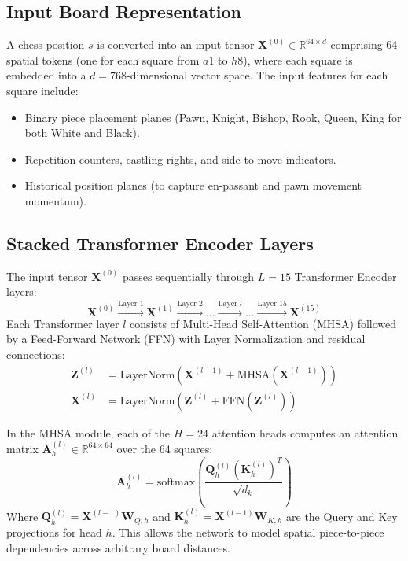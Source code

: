 \documentclass[11pt,a4paper]{report}
\begin{document}
\subsection{Input Board Representation}
A chess position $s$ is converted into an input tensor $\mathbf{X}^{(0)} \in \mathbb{R}^{64 \times d}$ comprising 64 spatial tokens (one for each square from $a1$ to $h8$), where each square is embedded into a $d=768$-dimensional vector space. The input features for each square include:
\begin{itemize}
    \item Binary piece placement planes (Pawn, Knight, Bishop, Rook, Queen, King for both White and Black).
    \item Repetition counters, castling rights, and side-to-move indicators.
    \item Historical position planes (to capture en-passant and pawn movement momentum).
\end{itemize}

\subsection{Stacked Transformer Encoder Layers}
The input tensor $\mathbf{X}^{(0)}$ passes sequentially through $L=15$ Transformer Encoder layers:
\begin{equation}
\mathbf{X}^{(0)} \xrightarrow{\text{Layer 1}} \mathbf{X}^{(1)} \xrightarrow{\text{Layer 2}} \dots \xrightarrow{\text{Layer } l} \dots \xrightarrow{\text{Layer 15}} \mathbf{X}^{(15)}
\end{equation}
Each Transformer layer $l$ consists of Multi-Head Self-Attention (MHSA) followed by a Feed-Forward Network (FFN) with Layer Normalization and residual connections:
\begin{align}
\mathbf{Z}^{(l)} &= \text{LayerNorm}\left( \mathbf{X}^{(l-1)} + \text{MHSA}\left( \mathbf{X}^{(l-1)} \right) \right) \\
\mathbf{X}^{(l)} &= \text{LayerNorm}\left( \mathbf{Z}^{(l)} + \text{FFN}\left( \mathbf{Z}^{(l)} \right) \right)
\end{align}

In the MHSA module, each of the $H=24$ attention heads computes an attention matrix $\mathbf{A}_{h}^{(l)} \in \mathbb{R}^{64 \times 64}$ over the 64 squares:
\begin{equation}
\mathbf{A}_{h}^{(l)} = \text{softmax}\left( \frac{\mathbf{Q}_{h}^{(l)} (\mathbf{K}_{h}^{(l)})^T}{\sqrt{d_k}} \right)
\end{equation}
Where $\mathbf{Q}_{h}^{(l)} = \mathbf{X}^{(l-1)} \mathbf{W}_{Q,h}$ and $\mathbf{K}_{h}^{(l)} = \mathbf{X}^{(l-1)} \mathbf{W}_{K,h}$ are the Query and Key projections for head $h$. This allows the network to model spatial piece-to-piece dependencies across arbitrary board distances.
\end{document}
